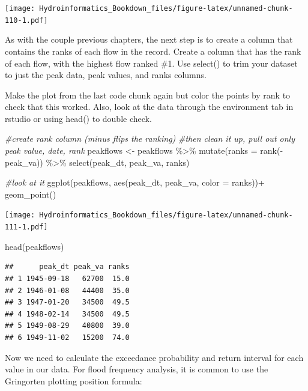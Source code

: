 \documentclass[
]{book}
\newenvironment{Shaded}{\begin{snugshade}}{\end{snugshade}}
\newcommand{\AttributeTok}[1]{\textcolor[rgb]{0.77,0.63,0.00}{#1}}
\newcommand{\CommentTok}[1]{\textcolor[rgb]{0.56,0.35,0.01}{\textit{#1}}}
\newcommand{\FunctionTok}[1]{\textcolor[rgb]{0.00,0.00,0.00}{#1}}
\newcommand{\NormalTok}[1]{#1}
\newcommand{\OtherTok}[1]{\textcolor[rgb]{0.56,0.35,0.01}{#1}}
\newcommand{\SpecialCharTok}[1]{\textcolor[rgb]{0.00,0.00,0.00}{#1}}
\begin{document}
\texttt{[image: Hydroinformatics\_Bookdown\_files/figure-latex/unnamed-chunk-110-1.pdf]}

As with the couple previous chapters, the next step is to create a column that contains the ranks of each flow in the record. Create a column that has the rank of each flow, with the highest flow ranked \#1. Use select() to trim your dataset to just the peak data, peak values, and ranks columns.

Make the plot from the last code chunk again but color the points by rank to check that this worked.
Also, look at the data through the environment tab in rstudio or using head() to double check.

\begin{Shaded}
\begin{Highlighting}[]
\CommentTok{\#create rank column (minus flips the ranking)}
\CommentTok{\#then clean it up, pull out only peak value, date, rank}
\NormalTok{peakflows }\OtherTok{\textless{}{-}}\NormalTok{ peakflows }\SpecialCharTok{\%\textgreater{}\%} 
  \FunctionTok{mutate}\NormalTok{(}\AttributeTok{ranks =} \FunctionTok{rank}\NormalTok{(}\SpecialCharTok{{-}}\NormalTok{peak\_va)) }\SpecialCharTok{\%\textgreater{}\%}
  \FunctionTok{select}\NormalTok{(peak\_dt, peak\_va, ranks)}

\CommentTok{\#look at it}
\FunctionTok{ggplot}\NormalTok{(peakflows, }
       \FunctionTok{aes}\NormalTok{(peak\_dt, peak\_va, }\AttributeTok{color =}\NormalTok{ ranks))}\SpecialCharTok{+}
  \FunctionTok{geom\_point}\NormalTok{()}
\end{Highlighting}
\end{Shaded}

\texttt{[image: Hydroinformatics\_Bookdown\_files/figure-latex/unnamed-chunk-111-1.pdf]}

\begin{Shaded}
\begin{Highlighting}[]
\FunctionTok{head}\NormalTok{(peakflows)}
\end{Highlighting}
\end{Shaded}

\begin{verbatim}
##      peak_dt peak_va ranks
## 1 1945-09-18   62700  15.0
## 2 1946-01-08   44400  35.0
## 3 1947-01-20   34500  49.5
## 4 1948-02-14   34500  49.5
## 5 1949-08-29   40800  39.0
## 6 1949-11-02   15200  74.0
\end{verbatim}

Now we need to calculate the exceedance probability and return interval for each value in our data. For flood frequency analysis, it is common to use the Gringorten plotting position formula:
\end{document}
